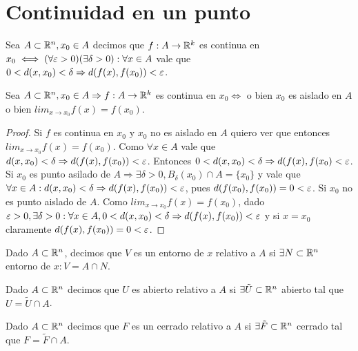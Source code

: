 \section{Continuidad en un punto}

\begin{definition}
  Sea $A \subset \mathbb{R}^n, x_0 \in A$ decimos que $f: A \to \mathbb{R}^k$ es continua en $x_0 \iff (\forall \varepsilon > 0)(\exists \delta > 0) : \forall x \in A$ vale que $0 < d(x, x_0) < \delta \Rightarrow d(f(x), f(x_0)) < \varepsilon$.  
\end{definition}

\begin{lemma}
  Sea $A \subset \mathbb{R}^n, x_0 \in A \Rightarrow f: A \to \mathbb{R}^k$ es continua en $x_0 \iff$ o bien $x_0$ es aislado en $A$ o bien $lim_{x \to x_0} f(x) = f(x_0)$.
  \begin{proof}
    Si $f$ es continua en $x_0$ y $x_0$ no es aislado en $A$ quiero ver que entonces $lim_{x \to x_0} f(x) = f(x_0)$. Como $\forall x \in A$ vale que $d(x, x_0) < \delta \Rightarrow d(f(x), f(x_0)) < \varepsilon$. Entonces $0 < d(x, x_0) < \delta \Rightarrow d(f(x), f(x_0) < \varepsilon$. Si $x_0$ es punto asilado de $A \Rightarrow \exists \delta>0, B_{\delta}(x_0) \cap A =  \{x_0\}$ y vale que $\forall x \in A : d(x, x_0) < \delta \Rightarrow d(f(x), f(x_0)) < \varepsilon$, pues $d(f(x_0), f(x_0)) = 0 < \varepsilon$. Si $x_0$ no es punto aislado de $A$. Como $lim_{x \to x_0} f(x) = f(x_0)$, dado $\varepsilon > 0, \exists \delta > 0 : \forall x \in A, 0 < d(x, x_0) < \delta \Rightarrow d(f(x), f(x_0)) < \varepsilon$ y si $x = x_0$ claramente $d(f(x), f(x_0)) = 0 < \varepsilon$.
  \end{proof}
\end{lemma}

\begin{definition}
  Dado $A \subset \mathbb{R}^n$, decimos que $V$ es un entorno de $x$ relativo a $A$ si $\exists N \subset \mathbb{R}^n$ entorno de $x : V = A \cap N$.
\end{definition}

\begin{definition}
  Dado $A \subset \mathbb{R}^n$ decimos que $U$ es abierto relativo a $A$ si $\exists \tilde{U} \subset \mathbb{R}^n$ abierto tal que $U = \tilde{U} \cap A$.
\end{definition}

\begin{definition}
  Dado $A \subset \mathbb{R}^n$ decimos que $F$ es un cerrado relativo a $A$ si $\exists \tilde{F} \subset \mathbb{R}^n$ cerrado tal que $F = \tilde{F} \cap A$.
\end{definition}

